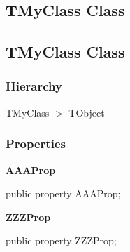\documentclass{report}
\newif\ifpdf
\begin{document}
\subsection*{\large{\textbf{TMyClass Class}}\normalsize\hspace{1ex}\hrulefill}
\else
\subsection*{TMyClass Class}
\fi
\label{ok_sorting.TMyClass}
\subsubsection*{\large{\textbf{Hierarchy}}\normalsize\hspace{1ex}\hfill}
TMyClass {$>$} TObject
\subsubsection*{\large{\textbf{Properties}}\normalsize\hspace{1ex}\hfill}
\begin{list}{}{
\setlength{\itemindent}{0cm}
\setlength{\listparindent}{0cm}
\setlength{\leftmargin}{\evensidemargin}
\addtolength{\leftmargin}{\tmplength}
\settowidth{\labelsep}{X}
\addtolength{\leftmargin}{\labelsep}
\setlength{\labelwidth}{\tmplength}
}
\label{ok_sorting.TMyClass-AAAProp}
\item[\textbf{AAAProp}\hfill]
\ifpdf
\begin{flushleft}
\fi
\begin{ttfamily}
public property AAAProp;\end{ttfamily}

\ifpdf
\end{flushleft}
\fi


\par  \label{ok_sorting.TMyClass-ZZZProp}
\item[\textbf{ZZZProp}\hfill]
\ifpdf
\begin{flushleft}
\fi
\begin{ttfamily}
public property ZZZProp;\end{ttfamily}

\ifpdf
\end{flushleft}
\fi


\par  \end{list}
\end{document}
